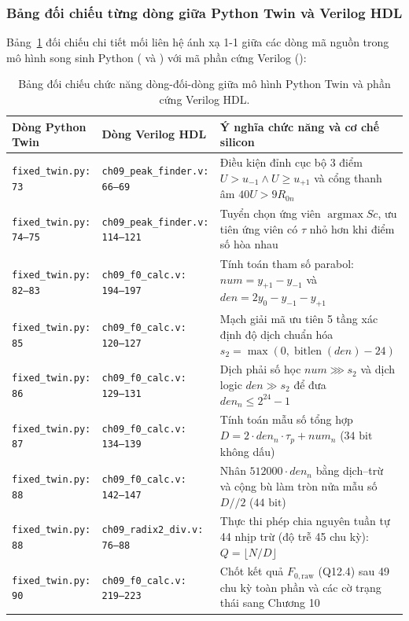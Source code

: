 \subsubsection*{Bảng đối chiếu từng dòng giữa Python Twin và Verilog HDL}
Bảng~\ref{tab:ch09_twin_vs_hdl} đối chiếu chi tiết mối liên hệ ánh xạ 1-1 giữa các dòng mã nguồn trong mô hình song sinh Python ( và ) với mã phần cứng Verilog ():

\begin{table}[H]
\centering
\small
\caption{Bảng đối chiếu chức năng dòng-đối-dòng giữa mô hình Python Twin và phần cứng Verilog HDL.}
\label{tab:ch09_twin_vs_hdl}
\begin{tabularx}{\textwidth}{l l X}
\toprule
\textbf{Dòng Python Twin} & \textbf{Dòng Verilog HDL} & \textbf{Ý nghĩa chức năng và cơ chế silicon} \\
\midrule
\texttt{fixed\_twin.py: 73} & \texttt{ch09\_peak\_finder.v: 66--69} & Điều kiện đỉnh cục bộ 3 điểm $U > u_{-1} \land U \ge u_{+1}$ và cổng thanh âm $40U > 9R_{0n}$ \\
\texttt{fixed\_twin.py: 74--75} & \texttt{ch09\_peak\_finder.v: 114--121} & Tuyển chọn ứng viên $\operatorname{argmax} Sc$, ưu tiên ứng viên có $\tau$ nhỏ hơn khi điểm số hòa nhau \\
\texttt{fixed\_twin.py: 82--83} & \texttt{ch09\_f0\_calc.v: 194--197} & Tính toán tham số parabol: $num = y_{+1} - y_{-1}$ và $den = 2y_0 - y_{-1} - y_{+1}$ \\
\texttt{fixed\_twin.py: 85} & \texttt{ch09\_f0\_calc.v: 120--127} & Mạch giải mã ưu tiên 5 tầng xác định độ dịch chuẩn hóa $s_2 = \max(0, \operatorname{bitlen}(den) - 24)$ \\
\texttt{fixed\_twin.py: 86} & \texttt{ch09\_f0\_calc.v: 129--131} & Dịch phải số học $num \ggg s_2$ và dịch logic $den \gg s_2$ để đưa $den_n \le 2^{24}-1$ \\
\texttt{fixed\_twin.py: 87} & \texttt{ch09\_f0\_calc.v: 134--139} & Tính toán mẫu số tổng hợp $D = 2 \cdot den_n \cdot \tau_p + num_n$ ($34\text{ bit}$ không dấu) \\
\texttt{fixed\_twin.py: 88} & \texttt{ch09\_f0\_calc.v: 142--147} & Nhân $512000 \cdot den_n$ bằng dịch--trừ và cộng bù làm tròn nửa mẫu số $D//2$ ($44\text{ bit}$) \\
\texttt{fixed\_twin.py: 88} & \texttt{ch09\_radix2\_div.v: 76--88} & Thực thi phép chia nguyên tuần tự 44 nhịp trừ (độ trễ 45 chu kỳ): $Q = \lfloor N / D \rfloor$ \\
\texttt{fixed\_twin.py: 90} & \texttt{ch09\_f0\_calc.v: 219--223} & Chốt kết quả $F_{0, \text{raw}}$ (Q12.4) sau 49 chu kỳ toàn phần và các cờ trạng thái sang Chương 10 \\
\bottomrule
\end{tabularx}
\end{table}

